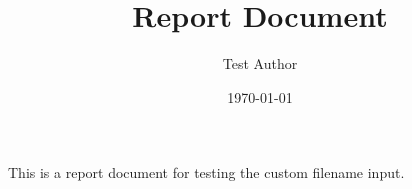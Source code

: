 \documentclass{article}
\title{Report Document}
\author{Test Author}
\date{\today}
\begin{document}
\maketitle
This is a report document for testing the custom filename input.
\end{document}
